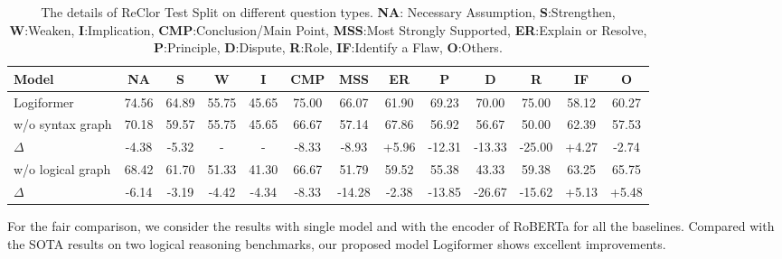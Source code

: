 \documentclass[sigconf]{acmart}
\begin{document}
\begin{table*}[t]
	\centering
	\caption{The details of ReClor Test Split on different question types. \textbf{NA}: Necessary Assumption, \textbf{S}:Strengthen, \textbf{W}:Weaken, \textbf{I}:Implication, \textbf{CMP}:Conclusion/Main Point, \textbf{MSS}:Most Strongly Supported, \textbf{ER}:Explain or Resolve, \textbf{P}:Principle, \textbf{D}:Dispute, \textbf{R}:Role, \textbf{IF}:Identify a Flaw, \textbf{O}:Others.}
	\vspace{-0.1cm}
	\begin{tabular}{p{3.2cm}|cccccccccccc}
		\toprule
		\textbf{Model} &\textbf{NA} &\textbf{S} &\textbf{W}  &\textbf{I} &\textbf{CMP} &\textbf{MSS} &\textbf{ER} &\textbf{P} &\textbf{D} &\textbf{R} &\textbf{IF} &\textbf{O}\\
		\hline
		Logiformer &74.56 &64.89 &55.75 &45.65 &75.00 &66.07 &61.90 &69.23 &70.00 &75.00 &58.12 &60.27 \\
		\hline
		\quad\quad w/o syntax graph &70.18 &59.57 &55.75 &45.65 &66.67 &57.14 &67.86 &56.92 &56.67 &50.00 &62.39 &57.53 \\
		\quad\quad\quad\quad\quad $\Delta$ & \cellcolor{red!15}-4.38 &\cellcolor{red!15}-5.32 &- &- &\cellcolor{red!15}-8.33 &\cellcolor{red!15}-8.93 &\cellcolor{green!15}+5.96 &\cellcolor{red!15}-12.31 &\cellcolor{red!15}-13.33 &\cellcolor{red!15}-25.00 &\cellcolor{green!15}+4.27 &\cellcolor{red!15}-2.74\\
		\hline
		\quad\quad w/o logical graph &68.42 &61.70 &51.33 &41.30 &66.67 &51.79 &59.52 &55.38 &43.33 &59.38 &63.25 &65.75 \\
		\quad\quad\quad\quad\quad $\Delta$ &\cellcolor{red!15}-6.14 &\cellcolor{red!15}-3.19 &\cellcolor{red!15}-4.42 &\cellcolor{red!15}-4.34 &\cellcolor{red!15}-8.33 &\cellcolor{red!15}-14.28 &\cellcolor{red!15}-2.38 &\cellcolor{red!15}-13.85 &\cellcolor{red!15}-26.67 &\cellcolor{red!15}-15.62 &\cellcolor{green!15}+5.13 &\cellcolor{green!15}+5.48 \\
		\bottomrule
	\end{tabular}
	\label{RECLOR_test}
	\vspace{-0.3cm}
\end{table*}

For the fair comparison, we consider the results with single model and with the encoder of RoBERTa for all the baselines. Compared with the SOTA results on two logical reasoning benchmarks, our proposed model Logiformer shows excellent improvements.
\end{document}
